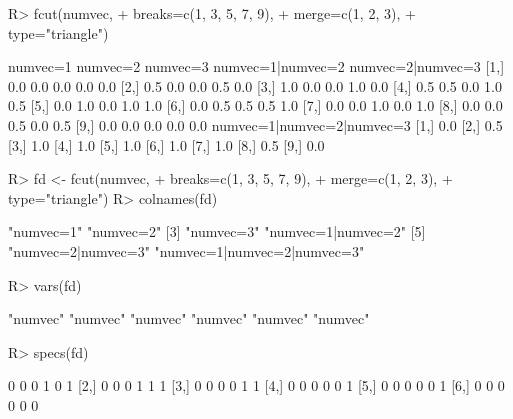 \documentclass{article}\usepackage[]{graphicx}\usepackage[]{color}
\begin{document}
\begin{Schunk}
% --begin: "fcut.merge2"
\begin{Sinput}
R> fcut(numvec,
+       breaks=c(1, 3, 5, 7, 9),
+       merge=c(1, 2, 3),
+       type="triangle")
\end{Sinput}
\begin{Soutput}
      numvec=1 numvec=2 numvec=3 numvec=1|numvec=2 numvec=2|numvec=3
 [1,]      0.0      0.0      0.0               0.0               0.0
 [2,]      0.5      0.0      0.0               0.5               0.0
 [3,]      1.0      0.0      0.0               1.0               0.0
 [4,]      0.5      0.5      0.0               1.0               0.5
 [5,]      0.0      1.0      0.0               1.0               1.0
 [6,]      0.0      0.5      0.5               0.5               1.0
 [7,]      0.0      0.0      1.0               0.0               1.0
 [8,]      0.0      0.0      0.5               0.0               0.5
 [9,]      0.0      0.0      0.0               0.0               0.0
      numvec=1|numvec=2|numvec=3
 [1,]                        0.0
 [2,]                        0.5
 [3,]                        1.0
 [4,]                        1.0
 [5,]                        1.0
 [6,]                        1.0
 [7,]                        1.0
 [8,]                        0.5
 [9,]                        0.0
\end{Soutput}
%
% --end: "fcut.merge2"
\end{Schunk}

\begin{Schunk}
% --begin: "fcut.varsspecs"
\begin{Sinput}
R> fd <- fcut(numvec,
+             breaks=c(1, 3, 5, 7, 9),
+             merge=c(1, 2, 3),
+             type="triangle")
R> colnames(fd)
\end{Sinput}
\begin{Soutput}
[1] "numvec=1"                   "numvec=2"                  
[3] "numvec=3"                   "numvec=1|numvec=2"         
[5] "numvec=2|numvec=3"          "numvec=1|numvec=2|numvec=3"
\end{Soutput}
\begin{Sinput}
R> vars(fd)
\end{Sinput}
\begin{Soutput}
[1] "numvec" "numvec" "numvec" "numvec" "numvec" "numvec"
\end{Soutput}
\begin{Sinput}
R> specs(fd)
\end{Sinput}
\begin{Soutput}
     [,1] [,2] [,3] [,4] [,5] [,6]
[1,]    0    0    0    1    0    1
[2,]    0    0    0    1    1    1
[3,]    0    0    0    0    1    1
[4,]    0    0    0    0    0    1
[5,]    0    0    0    0    0    1
[6,]    0    0    0    0    0    0
\end{Soutput}
%
% --end: "fcut.varsspecs"
\end{Schunk}
\end{document}
